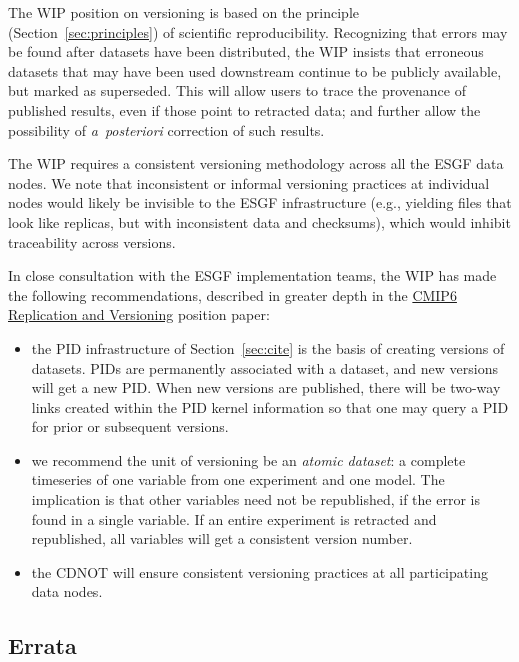 \documentclass[gmd,manuscript]{copernicus}
\newcommand{\secref}[1] {\mbox{Section  \ref{sec:#1}}}
\begin{document}
The WIP position on versioning is based on the principle
(\secref{principles}) of scientific reproducibility. Recognizing that
errors may be found after datasets have been distributed, the WIP
insists that erroneous datasets that may have been used downstream
continue to be publicly available, but marked as superseded. This will
allow users to trace the provenance of published results, even if
those point to retracted data; and further allow the possibility of
\emph{a~posteriori} correction of such results.

The WIP requires a consistent versioning methodology across all the
ESGF data nodes. We note that inconsistent or informal versioning
practices at individual nodes would likely be invisible to the ESGF
infrastructure (e.g., yielding files that look like replicas, but with
inconsistent data and checksums), which would inhibit traceability
across versions.

In close consultation with the ESGF implementation teams, the WIP has
made the following recommendations, described in greater depth in the
\href{https://goo.gl/Bs4Qou}{CMIP6 Replication and Versioning}
position paper:

\begin{itemize}
\item the PID infrastructure of \secref{cite} is the basis of creating
  versions of datasets. PIDs are permanently associated with a
  dataset, and new versions will get a new PID. When new versions are
  published, there will be two-way links created within the PID kernel
  information so that one may query a PID for prior or subsequent
  versions.
\item we recommend the unit of versioning be an \emph{atomic dataset}:
  a complete timeseries of one variable from one experiment and one
  model. The implication is that other variables need not be
  republished, if the error is found in a single variable. If an entire
  experiment is retracted and republished, all variables will get a
  consistent version number.
\item the CDNOT will ensure consistent versioning practices at all
  participating data nodes.
\end{itemize}

\subsection{Errata}
\label{sec:errata}
\end{document}
